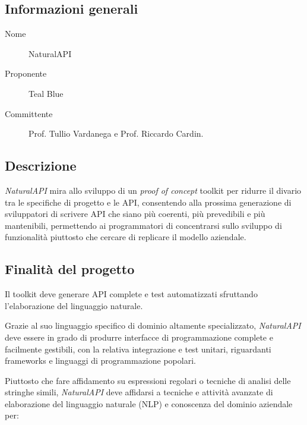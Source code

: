 \documentclass[../studio-di-fattibilita.tex]{subfiles}
\begin{document}
  \subsection{Informazioni generali} \label{subsec:informazioni_generali}

  \begin{description}
    \item[Nome] NaturalAPI
    \item[Proponente] Teal Blue
    \item[Committente] Prof. Tullio Vardanega e Prof. Riccardo Cardin.
  \end{description}



  \subsection{Descrizione} \label{subsec:descrizione}

    \textit{NaturalAPI} mira allo sviluppo di un \textit{proof of concept} toolkit
    per ridurre il divario tra le specifiche di progetto e le API, consentendo
    alla prossima generazione di sviluppatori di scrivere API che siano più
    coerenti, più prevedibili e più mantenibili, permettendo ai programmatori
    di concentrarsi sullo sviluppo di funzionalità piuttosto che cercare di
    replicare il modello aziendale.



  \subsection{Finalità del progetto} \label{subsec:finalità_del_progetto}
    Il toolkit deve generare API complete e test automatizzati sfruttando l'elaborazione
    del linguaggio naturale.

    Grazie al suo linguaggio specifico di dominio altamente specializzato, \textit{NaturalAPI}
    deve essere in grado di produrre interfacce di programmazione complete e facilmente gestibili,
    con la relativa integrazione e test unitari, riguardanti frameworks e linguaggi di
    programmazione popolari.

    Piuttosto che fare affidamento su espressioni regolari o tecniche di analisi delle
    stringhe simili, \textit{NaturalAPI} deve affidarsi a tecniche e attività avanzate di
    elaborazione del linguaggio naturale (NLP) e conoscenza del dominio aziendale per:
\end{document}
